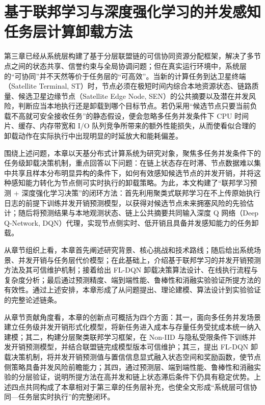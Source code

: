 \chapter{基于联邦学习与深度强化学习的并发感知任务层计算卸载方法}
\label{chap:fl_dqn_merged}

第三章已经从系统层构建了基于分层联盟链的可信协同资源分配框架，解决了多节点之间的状态共享、信誉约束与全局协调问题；但在真实运行环境中，系统层的“可协同”并不天然等价于任务层的“可高效”。当新的计算任务到达卫星终端（Satellite Terminal, ST）时，节点必须在极短时间内综合本地资源状态、链路质量、候选卫星边缘节点（Satellite Edge Node, SEN）的公共摘要以及潜在并发风险，判断应当本地执行还是卸载到哪个目标节点。若仍采用“候选节点只要当前负载不高就可安全接收任务”的静态假设，便会忽略多任务并发条件下 CPU 时间片、缓存、内存带宽和 I/O 队列竞争所带来的额外性能损失，从而使看似合理的卸载动作在实际执行中出现明显的时延放大和能耗偏差。

围绕上述问题，本章以天基分布式计算系统为研究对象，聚焦多任务并发条件下的任务级卸载决策机制，重点回答以下问题：在链上状态存在时滞、节点数据难以集中共享且样本分布明显异构的条件下，如何有效感知候选节点的并发开销，并将这种感知能力转化为节点侧可实时执行的卸载策略。为此，本文构建了“联邦学习预测 + 深度强化学习决策”的闭环方法：首先利用聚类式联邦学习在不上传原始执行日志的前提下训练并发开销预测模型，以获得对候选节点未来拥塞风险的先验估计；随后将预测结果与本地观测状态、链上公共摘要共同输入深度 Q 网络（Deep Q-Network, DQN）代理，实现节点侧实时、低开销且具备并发感知能力的任务卸载。

从章节组织上看，本章首先阐述研究背景、核心挑战和技术路线；随后给出系统场景、并发开销与任务层代价模型；在此基础上，介绍基于联邦学习的并发开销预测方法及其可信维护机制；接着给出 FL-DQN 卸载决策算法设计、在线执行流程与复杂度分析；最后通过预测精度、端到端性能、鲁棒性和消融实验验证所提方法的有效性。通过上述安排，本章形成了从问题提出、理论建模、算法设计到实验验证的完整论述链条。

从章节贡献角度看，本章的创新点可概括为四个方面：其一，面向多任务并发场景建立任务级并发开销形式化模型，将新任务进入成本与存量任务受扰成本统一纳入建模；其二，构建分层聚类联邦学习框架，在 Non-IID 与隐私受限条件下训练并发开销预测模型，并结合联盟链完成模型版本可信维护；其三，提出 FL-DQN 卸载决策机制，将并发开销预测值与置信信息显式融入状态空间和奖励函数，使节点侧策略具备并发风险前瞻能力；其四，通过预测层、端到端性能、鲁棒性和消融实验的分层验证，说明所提方法在高并发和链上状态滞后条件下仍具有稳定优势。上述四点共同构成了本章相对于第三章的任务层补充，也使全文形成“系统层可信协同—任务层实时执行”的完整闭环。

